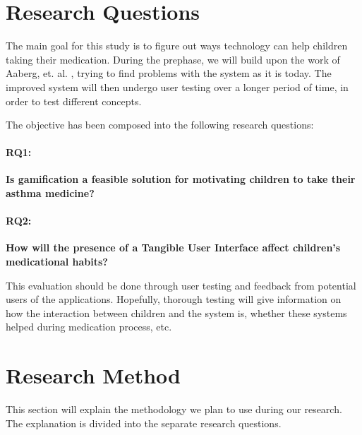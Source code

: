 \section{Research Questions}
\label{sec:researchquestions}
The main goal for this study is to figure out ways technology can help children taking their medication. During the prephase, we will build upon the work of Aaberg, et. al.  \cite{CustomerDriven}, trying to find problems with the system as it is today. The improved system will then undergo user testing over a longer period of time, in order to test different concepts.


The objective has been composed into the following research questions: 

\paragraph{RQ1:}
\textbf{Is gamification a feasible solution for motivating children to take their asthma medicine?}


\paragraph{RQ2:}
\textbf{How will the presence of a Tangible User Interface affect children's medicational habits?}


This evaluation should be done through user testing and feedback from potential users of the applications. Hopefully, thorough testing will give information on how the interaction between children and the system is, whether these systems helped during medication process, etc. 

\section{Research Method}
\label{sec:researchmethod}
This section will explain the methodology we plan to use during our research. The explanation is divided into the separate research questions.  

